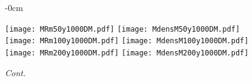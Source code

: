 \documentclass[universe,article,accept,moreauthors,pdftex]{Definitions/mdpi}
\begin{document}
\begin{figure}[H]\ContinuedFloat


\begin{adjustwidth}{-\extralength}{0cm}
\centering %

{\texttt{[image: MRm50y1000DM.pdf]}\vspace{3pt}
	  \texttt{[image: MdensM50y1000DM.pdf]}}\\\vspace{5pt}
{\texttt{[image: MRm100y1000DM.pdf]}\vspace{3pt}
	  \texttt{[image: MdensM100y1000DM.pdf]}}\\\vspace{5pt}
{\texttt{[image: MRm200y1000DM.pdf]}\vspace{3pt}
	  \texttt{[image: MdensM200y1000DM.pdf]}}\\
\end{adjustwidth}
\caption{\emph{Cont.}}
\label{fig:MRdens1000DM}

\end{figure}
\end{document}
